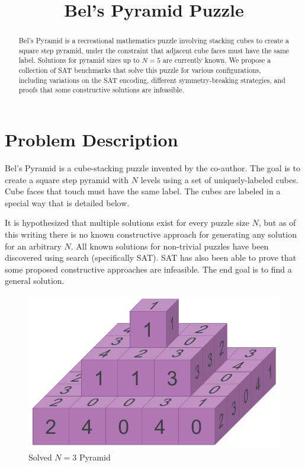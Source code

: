 \documentclass[conference]{IEEEtran}
\begin{document}
\title{Bel's Pyramid Puzzle}

\author{
\and
{}
}

\maketitle

\begin{abstract}
Bel's Pyramid is a recreational mathematics puzzle involving stacking cubes to create a square step pyramid,
under the constraint that adjacent cube faces must have the same label.
Solutions for pyramid sizes up to $N=5$ are currently known.
We propose a collection of SAT benchmarks that solve this puzzle for various configurations,
including variations on the SAT encoding, different symmetry-breaking strategies, and proofs
that some constructive solutions are infeasible.
\end{abstract}

\section{Problem Description}
Bel's Pyramid is a cube-stacking puzzle invented by the co-author.
The goal is to create a square step pyramid with $N$ levels using a set of uniquely-labeled cubes.
Cube faces that touch must have the same label.
The cubes are labeled in a special way that is detailed below.

It is hypothesized that multiple solutions exist for every puzzle size $N$, but as of this writing there is no known
constructive approach for generating any solution for an arbitrary $N$.
All known solutions for non-trivial puzzles have been discovered using search (specifically SAT).
SAT has also been able to prove that some proposed constructive approaches are infeasible.
The end goal is to find a general solution.

\begin{figure}[!t]
\centerline{\includegraphics[width=0.8\linewidth]{example.png}}
\caption{Solved $N=3$ Pyramid}
\label{example}
\end{figure}
\end{document}

